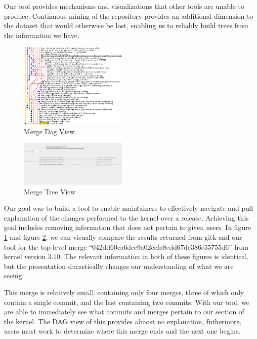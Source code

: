 \documentclass[conference, draftclsnofoot]{IEEEtran}
\begin{document}
Our tool provides mechanisms and visualizations that other tools are unable to
produce. Continuous mining of the repository provides an additional dimension
to the dataset that would otherwise be lost, enabling us to reliably build
trees from the information we have.

\begin{figure}[h]
	\centering
	\includegraphics[width=0.47\textwidth]{figures/042dd_DAG.png}
	\caption{Merge Dag View}
	\label{fig:dag_view}
\end{figure}

\begin{figure}[h]
	\centering
	\includegraphics[width=0.47\textwidth]{figures/042dd_tree.png}
	\caption{Merge Tree View}
	\label{fig:tree_view}
\end{figure}

Our goal was to build a tool to enable maintainers to effectively navigate and
pull explanation of the changes performed to the kernel over a release.
Achieving this goal includes removing information that does not pertain to given
users. In figure \ref{fig:dag_view} and figure \ref{fig:tree_view}, we can
visually compare the results returned from gitk and our tool for the top-level
merge ``042dd60ca6dec9a02cefa8edd67de386e35755d6'' from kernel version 3.10.
The relevant information in both of these figures is identical, but the
presentation durastically changes our understanding of what we are seeing.

This merge is relatively small, containing only four merges, three of which
only contain a single commit, and the last containing two commits. With our
tool, we are able to immediately see what commits and merges pertain to our
section of the kernel. The DAG view of this provides almost no explanation,
futhermore, users must work to determine where this merge ends and the next one
begins.
\end{document}
